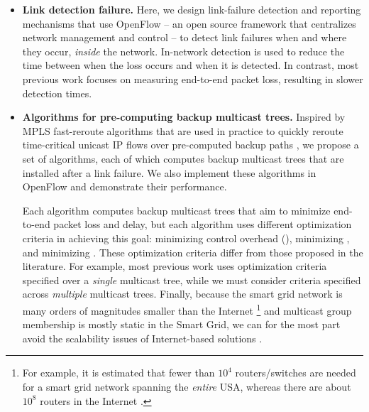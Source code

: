\begin{itemize}
	
	\item {\bf Link detection failure.} 
		Here, we design link-failure detection and reporting mechanisms that use OpenFlow \cite{OpenFlow08} -- an open source framework that centralizes network management and control -- 
		to detect link failures when and where they occur, \emph{inside} the network.  In-network detection is used to reduce the time between when the loss occurs and when it is detected. 
		In contrast, most previous work \cite{Almes99,Caceres99,Friedl09} focuses on measuring end-to-end packet loss, resulting in slower detection times. 

	\item {\bf Algorithms for pre-computing backup multicast trees.} 
		Inspired by MPLS fast-reroute algorithms that are used in practice to quickly reroute time-critical unicast IP flows over pre-computed backup paths \cite{Cui04,Fei01,Medard99,Pointurier02,Wu97}, 
		we propose a set of algorithms, each of which computes backup multicast trees that are installed after a link failure. We also implement these algorithms in OpenFlow and demonstrate their performance.
		
		Each algorithm computes backup multicast trees that aim to minimize end-to-end packet loss and delay, but each algorithm uses different optimization criteria in achieving this goal: 
		minimizing control overhead (\mcs), minimizing ,
   		and minimizing .  These optimization criteria differ from those proposed in the literature.
		For example, most previous work \cite{Cui04,Fei01,Medard99,Pointurier02,Wu97} uses optimization criteria specified over a \emph{single} multicast tree, while we must consider 
		criteria specified across \emph{multiple} multicast trees. Finally, because the smart grid network is many orders of magnitudes smaller than the Internet
		\footnote{For example, it is estimated that fewer than $10^4$ routers/switches are needed for a smart grid network spanning the \emph{entire} USA, whereas there are about $10^8$ routers in the Internet \cite{Bakken11}.} 
		and multicast group membership is mostly static in the Smart Grid, we can for the most part avoid the scalability issues of Internet-based solutions \cite{Cui04,Fei01,Medard99,Pointurier02,Wu97}.

\end{itemize}


